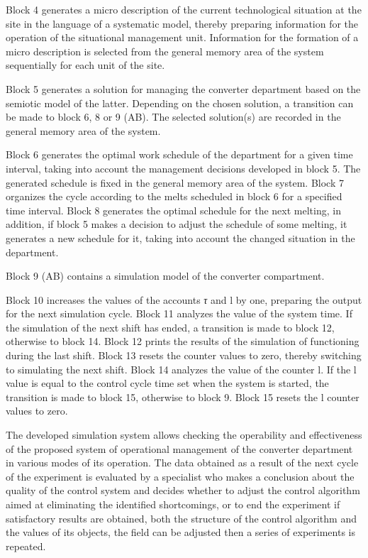 Block 4 generates a micro description of the current technological
situation at the site in the language of a systematic model, thereby
preparing information for the operation of the situational management
unit. Information for the formation of a micro description is selected
from the general memory area of the system sequentially for each unit of
the site.

Block 5 generates a solution for managing the converter department based
on the semiotic model of the latter. Depending on the chosen solution, a
transition can be made to block 6, 8 or 9 (AB). The selected solution(s)
are recorded in the general memory area of the system.

Block 6 generates the optimal work schedule of the department for a
given time interval, taking into account the management decisions
developed in block 5. The generated schedule is fixed in the general
memory area of the system. Block 7 organizes the cycle according to the
melts scheduled in block 6 for a specified time interval. Block 8
generates the optimal schedule for the next melting, in addition, if
block 5 makes a decision to adjust the schedule of some melting, it
generates a new schedule for it, taking into account the changed
situation in the department.

Block 9 (AB) contains a simulation model of the converter compartment.

Block 10 increases the values of the accounts \emph{τ} and l by one,
preparing the output for the next simulation cycle. Block 11 analyzes
the value of the system time. If the simulation of the next shift has
ended, a transition is made to block 12, otherwise to block 14. Block 12
prints the results of the simulation of functioning during the last
shift. Block 13 resets the counter values to zero, thereby switching to
simulating the next shift. Block 14 analyzes the value of the counter l.
If the l value is equal to the control cycle time set when the system is
started, the transition is made to block 15, otherwise to block 9. Block
15 resets the l counter values to zero.

The developed simulation system allows checking the operability and
effectiveness of the proposed system of operational management of the
converter department in various modes of its operation. The data
obtained as a result of the next cycle of the experiment is evaluated by
a specialist who makes a conclusion about the quality of the control
system and decides whether to adjust the control algorithm aimed at
eliminating the identified shortcomings, or to end the experiment if
satisfactory results are obtained, both the structure of the control
algorithm and the values of its objects, the field can be adjusted then
a series of experiments is repeated.

